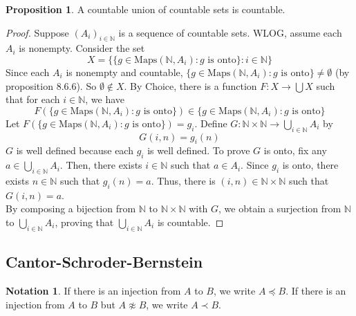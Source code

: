 \documentclass[14pt]{article}
\theoremstyle{definition}
\newtheorem{proposition}[definition]{Proposition}
\newtheorem{notation}[definition]{Notation}
\newcommand{\fun}[3]{#1\colon #2\rightarrow#3}
\newcommand{\bb}[1]{\mathbb{#1}}
\begin{document}
\vspace{4mm}

\begin{proposition}
    A countable union of countable sets is countable.
\end{proposition}
\begin{proof}
    Suppose $(A_i)_{i\in \bb{N}}$ is a sequence of countable sets. WLOG, 
    assume each $A_i$ is nonempty. Consider the set 
    \begin{equation*}
        X=\{\{g\in\mathrm{Maps}(\bb{N}, A_i)\colon g \text{ is onto}\}\colon i\in\bb{N}\}
    \end{equation*}
    Since each $A_i$ is nonempty and countable, 
    $\{g\in\mathrm{Maps}(\bb{N}, A_i)\colon g \text{ is onto}\}\not= \emptyset$ (by proposition 8.6.6).
    So $\emptyset\not\in X$. By Choice, there is a function $\fun{F}{X}{\bigcup X}$
    such that for each $i\in \bb{N}$, we have
    \begin{equation*}
        F(\{g\in\mathrm{Maps}(\bb{N}, A_i)\colon g \text{ is onto}\})\in \{g\in\mathrm{Maps}(\bb{N}, A_i)\colon g \text{ is onto}\}
    \end{equation*}
    Let $ F(\{g\in\mathrm{Maps}(\bb{N}, A_i)\colon g \text{ is onto}\})=g_i $.
    Define $\fun{G}{\bb{N}\times\bb{N}}{\bigcup_{i\in\bb{N}}A_i}$ by
    \begin{equation*}
        G(i,n)=g_i(n)
    \end{equation*}
    $G$ is well defined because each $g_i$ is well defined. To prove $G$ is onto,
    fix any $a\in \bigcup_{i\in\bb{N}}A_i$. Then, there exists $i\in \bb{N}$ such that 
    $a\in A_i$. Since $g_i$ is onto, there exists $n\in\bb{N}$ such that $g_i(n)=a$. Thus,
    there is $(i,n)\in\bb{N}\times\bb{N} $ such that $G(i,n)=a$.\\
    By composing a bijection from $\bb{N}$ to $\bb{N}\times\bb{N}$ with $G$, we obtain a surjection from 
    $\bb{N}$ to $\bigcup_{i\in\bb{N}}A_i$, proving that $\bigcup_{i\in\bb{N}}A_i$ is countable.
\end{proof}

\vspace{5mm}

\subsection{Cantor-Schroder-Bernstein}

\begin{notation}
If there is an injection from $A$ to $B$, we write $A\preceq B$. If there is an injection from $A$ to $B$
but $A\not\approx B$, we write $A\prec B$.
\end{notation}
\end{document}
